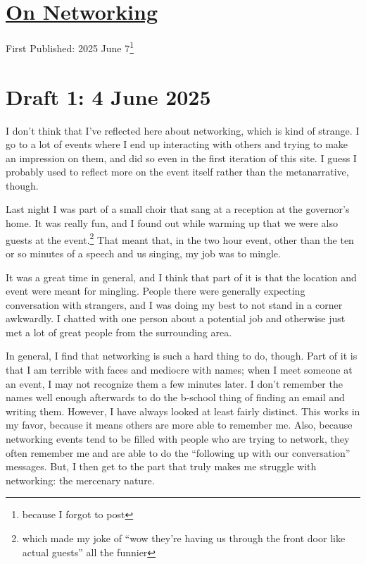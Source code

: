 \documentclass[12pt]{article}
\newcommand{\say}[1]{``#1''}
\renewcommand{\,}{\textsuperscript{,}}
\begin{document}
  
\doublespacing  
\section{\href{networking.html}{On Networking}}  
First Published: 2025 June 7\footnote{because I forgot to post}

\section{Draft 1: 4 June 2025}

I don't think that I've reflected here about networking, which is kind of strange.  
I go to a lot of events where I end up interacting with others and trying to make an impression on them, and did so even in the first iteration of this site.  
I guess I probably used to reflect more on the event itself rather than the metanarrative, though.

Last night I was part of a small choir that sang at a reception at the governor's home.  
It was really fun, and I found out while warming up that we were also guests at the event.\footnote{which made my joke of \say{wow they're having us through the front door like actual guests} all the funnier}  
That meant that, in the two hour event, other than the ten or so minutes of a speech and us singing, my job was to mingle.

It was a great time in general, and I think that part of it is that the location and event were meant for mingling.  
People there were generally expecting conversation with strangers, and I was doing my best to not stand in a corner awkwardly.  
I chatted with one person about a potential job and otherwise just met a lot of great people from the surrounding area.

In general, I find that networking is such a hard thing to do, though.  
Part of it is that I am terrible with faces and mediocre with names; when I meet someone at an event, I may not recognize them a few minutes later.  
I don't remember the names well enough afterwards to do the b-school thing of finding an email and writing them.  
However, I have always looked at least fairly distinct.  
This works in my favor, because it means others are more able to remember me.  
Also, because networking events tend to be filled with people who are trying to network, they often remember me and are able to do the \say{following up with our conversation} messages.  
But, I then get to the part that truly makes me struggle with networking: the mercenary nature.
\end{document}
